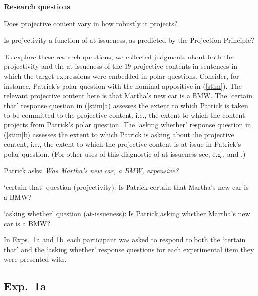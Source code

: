 \documentclass[11pt,fleqn]{article}
\newcommand{\6}{\mbox{$[\hspace*{-.6mm}[$}}
\newcommand{\9}{\mbox{$]\hspace*{-.6mm}]$}}
\begin{document}
\begin{exe}
\ex\label{questions} {\bf Research questions}

\begin{xlist} 

\ex Does projective content vary in how robustly it projects?

\ex Is projectivity a function of at-issueness, as predicted by the Projection Principle?
\end{xlist}

\end{exe} 
To explore these research questions, we collected judgments about both the projectivity and the at-issueness of the 19 projective contents in sentences in which the target expressions were embedded in polar questions. Consider, for instance, Patrick's polar question with the nominal appositive in (\ref{stim}). The relevant projective content here is that Martha's new car is a BMW. The `certain that' response question in (\ref{stim}a) assesses the extent to which Patrick is taken to be committed to the projective content, i.e., the extent to which the content projects from Patrick's polar question. The `asking whether' response question in (\ref{stim}b) assesses the extent to which Patrick is asking about the projective content, i.e., the extent to which the projective content is at-issue in Patrick's polar question. (For other uses of this diagnostic of at-issueness see, e.g., \citealt{amaral-etal07} and \citealt{tonhauser-sula6}.)

\begin{exe}

\ex\label{stim} Patrick asks: {\em Was Martha's new car, a BMW, expensive?} 

\begin{xlist}
\ex `certain that' question (projectivity): Is Patrick certain that Martha's new car is a BMW?

\ex `asking whether' question (at-issueness): Is Patrick asking whether Martha's new car is a BMW?

\end{xlist}

\end{exe}
In Exps.~1a and 1b, each participant was asked to respond to both the `certain that'  and the `asking whether' response questions for each experimental item they were presented with.

\subsection{Exp.~1a}\label{s-exp1a}
\end{document}
